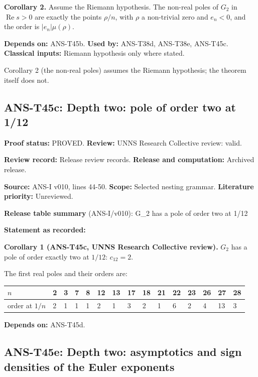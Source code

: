 \documentclass[
  11pt,
]{article}
\begin{document}
\textbf{Corollary 2.} Assume the Riemann hypothesis. The non-real poles
of \(G_2\) in \(\operatorname{Re}s>0\) are exactly the points
\(\rho/n\), with \(\rho\) a non-trivial zero and \(e_n<0\), and the
order is \(|e_n|\mu(\rho)\).

\textbf{Depends on:} ANS-T45b. \textbf{Used by:} ANS-T38d, ANS-T38e,
ANS-T45c. \textbf{Classical inputs:} Riemann hypothesis only where
stated.

Corollary 2 (the non-real poles) assumes the Riemann hypothesis; the
theorem itself does not.

\hypertarget{ans-t45c-depth-two-pole-of-order-two-at-112}{%
\subsection{ANS-T45c: Depth two: pole of order two at
1/12}\label{ans-t45c-depth-two-pole-of-order-two-at-112}}

\textbf{Proof status:} PROVED. \textbf{Review:} UNNS Research Collective
review: valid.

\textbf{Review record:} Release review records. \textbf{Release and
computation:} Archived release.

\textbf{Source:} ANS-I v010, lines 44-50. \textbf{Scope:} Selected
nesting grammar. \textbf{Literature priority:} Unreviewed.

\textbf{Release table summary} (ANS-I/v010): G\_2 has a pole of order
two at 1/12

\textbf{Statement as recorded:}

\textbf{Corollary 1 (ANS-T45c, UNNS Research Collective review).}
\(G_2\) has a pole of order exactly two at \(1/12\): \(c_{12}=2\).

The first real poles and their orders are:

\begin{longtable}[]{@{}lllllllllllllll@{}}
\toprule
\(n\) & 2 & 3 & 7 & 8 & 12 & 13 & 17 & 18 & 21 & 22 & 23 & 26 & 27 &
28\tabularnewline
\midrule
\endhead
order at \(1/n\) & 2 & 1 & 1 & 1 & 2 & 1 & 3 & 2 & 1 & 6 & 2 & 4 & 13 &
3\tabularnewline
\bottomrule
\end{longtable}

\textbf{Depends on:} ANS-T45d.

\hypertarget{ans-t45e-depth-two-asymptotics-and-sign-densities-of-the-euler-exponents}{%
\subsection{ANS-T45e: Depth two: asymptotics and sign densities of the
Euler
exponents}\label{ans-t45e-depth-two-asymptotics-and-sign-densities-of-the-euler-exponents}}
\end{document}
